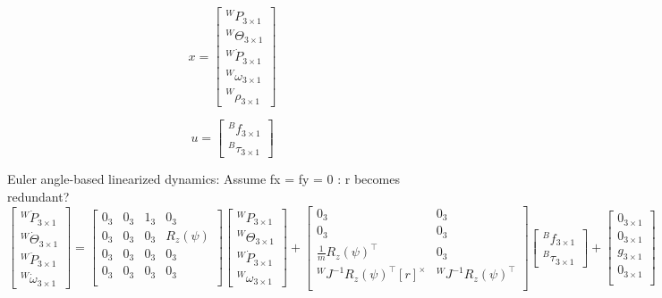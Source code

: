 \documentclass{article}
\begin{document}
\begin{equation}
	x = \begin{bmatrix}
	{}^W P_{3 \times 1}\\
	{}^W\Theta_{3 \times 1}\\
	{}^W\dot{P}_{3 \times 1}\\
	{}^W\omega_{3 \times 1}\\
	{}^W \rho_{3 \times 1}
	\end{bmatrix}
\end{equation}

\begin{equation}
	u = \begin{bmatrix}
	{}^B f_{3 \times 1} \\
	{}^B\tau_{3 \times 1}
	\end{bmatrix}
\end{equation}

Euler angle-based linearized dynamics:
Assume fx = fy = 0 : r becomes redundant?
\begin{equation}
	\begin{bmatrix}
	{}^W \dot{P}_{3 \times 1}\\
	{}^W \dot{\Theta}_{3 \times 1}\\
	{}^W \ddot{P}_{3 \times 1}\\
	{}^W \dot{\omega}_{3 \times 1}
	\end{bmatrix} = 
	\begin{bmatrix}
		0_3 & 0_3 & 1_3 & 0_3  \\
		0_3 & 0_3 & 0_3 & R_z(\psi)  \\
		0_3 & 0_3 & 0_3 & 0_3 \\
		0_3 & 0_3 & 0_3 & 0_3 \\
	\end{bmatrix}
	\begin{bmatrix}
	{}^W P_{3 \times 1}\\
	{}^W \Theta_{3 \times 1}\\
	{}^W \dot{P}_{3 \times 1}\\
	{}^W {\omega}_{3 \times 1}
	\end{bmatrix} + 
	\begin{bmatrix}
		0_3 & 0_3 \\
		0_3 & 0_3 \\
		\frac{1}{m} R_z(\psi)^\top & 0_3 \\
		{}^WJ^{-1} R_z(\psi)^\top [r]^\times & {}^WJ^{-1} R_z(\psi)^\top \\
	\end{bmatrix}
	\begin{bmatrix}
	{}^B f_{3 \times 1} \\
	{}^B\tau_{3 \times 1}
	\end{bmatrix} +
	\begin{bmatrix}
	0_{3\times 1} \\
	0_{3\times 1} \\
	g_{3\times 1} \\
	0_{3\times 1} \\
	\end{bmatrix}
\end{equation}
\end{document}
